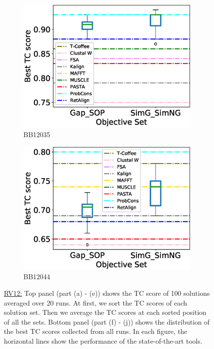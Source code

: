 \begin{figure}[!htbp]
\begin{adjustwidth}{-1.5cm}{-1cm}
\begin{subfigure}{0.22\textwidth}
			\includegraphics[width=\columnwidth]{Figure/summary/precomputedInit/Balibase/BB12035_objset_tc_rank_2}
			\caption{BB12035}
		\end{subfigure}
		\begin{subfigure}{0.22\textwidth}
			\includegraphics[width=\columnwidth]{Figure/summary/precomputedInit/Balibase/BB12044_objset_tc_rank_2}
			\caption{BB12044}
		\end{subfigure}
		\end{adjustwidth}
		\caption[TC score results on RV12]{\underline{RV12:} Top panel (part (a) - (e)) shows the TC score of 100 solutions averaged over 20 runs. At first, we sort the TC scores of each solution set. Then we average the TC scores at each sorted position of all the sets. Bottom panel (part (f) - (j)) shows the distribution of the best TC scores collected from all runs. In each figure, the horizontal lines show the performance of the state-of-the-art tools.}
		\label{fig:rv12_tc}

\end{figure}


